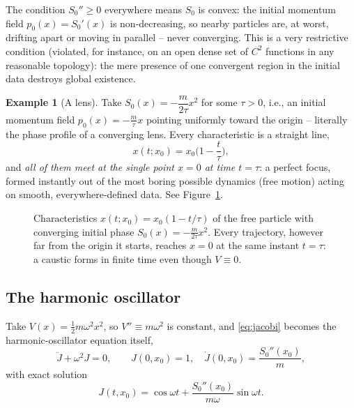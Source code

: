 \documentclass[11pt]{article}
\theoremstyle{plain}
\theoremstyle{definition}
\newtheorem{example}[theorem]{Example}
\theoremstyle{remark}
\begin{document}
The condition $S_0''\ge0$ everywhere means $S_0$ is convex: the initial
momentum field $p_0(x)=S_0'(x)$ is non-decreasing, so nearby particles are, at
worst, drifting apart or moving in parallel -- never converging. This is a very
restrictive condition (violated, for instance, on an open dense set of $C^2$
functions in any reasonable topology): the mere presence of one convergent
region in the initial data destroys global existence.

\begin{example}[A lens]
Take $S_0(x) = -\dfrac{m}{2\tau}x^2$ for some $\tau>0$, i.e., an initial
    momentum field $p_0(x)=-\frac{m}{\tau}x$ pointing uniformly toward the
    origin -- literally the phase profile of a converging lens. Every
    characteristic is a straight line,
\[
x(t;x_0) = x_0\Big(1-\frac{t}{\tau}\Big),
\]
and \emph{all of them meet at the single point $x=0$ at time $t=\tau$}: a
    perfect focus, formed instantly out of the most boring possible dynamics
    (free motion) acting on smooth, everywhere-defined data. See
    Figure~\ref{fig:focus}.
\end{example}

\begin{figure}[h]
\centering
{}
\caption{Characteristics $x(t;x_0)=x_0(1-t/\tau)$ of the free particle with
    converging initial phase $S_0(x)=-\frac{m}{2\tau}x^2$. Every trajectory,
    however far from the origin it starts, reaches $x=0$ at the same instant
    $t=\tau$: a caustic forms in finite time even though $V\equiv0$.}
\label{fig:focus}
\end{figure}

\subsection{The harmonic oscillator}
\label{sec:sho}

Take $V(x)=\tfrac12 m\omega^2x^2$, so $V''\equiv m\omega^2$ is constant, and
\eqref{eq:jacobi} becomes the harmonic-oscillator equation itself,
\[
\ddot J + \omega^2 J = 0, \qquad J(0,x_0)=1,\quad \dot J(0,x_0)=\frac{S_0''(x_0)}{m},
\]
with exact solution
\begin{equation}
J(t,x_0) = \cos\omega t + \frac{S_0''(x_0)}{m\omega}\sin\omega t.
\label{eq:Jsho}
\end{equation}
\end{document}
